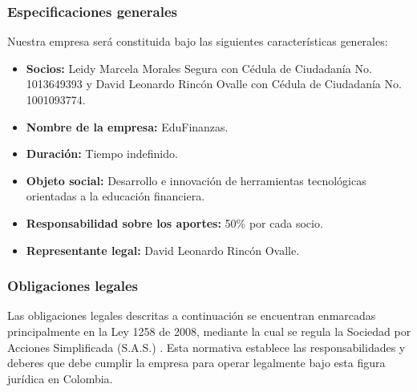 \subsubsection*{Especificaciones generales}


Nuestra empresa será constituida bajo las siguientes características generales:

\begin{itemize}
	\item \textbf{Socios:} Leidy Marcela Morales Segura con Cédula de Ciudadanía No. 1013649393 y David Leonardo Rincón Ovalle con Cédula de Ciudadanía No. 1001093774.
	
	\item \textbf{Nombre de la empresa:} EduFinanzas.
	
	\item \textbf{Duración:} Tiempo indefinido.
	
	\item \textbf{Objeto social:} Desarrollo e innovación de herramientas tecnológicas orientadas a la educación financiera.
	
	\item \textbf{Responsabilidad sobre los aportes:} 50\% por cada socio.
	
	\item \textbf{Representante legal:} David Leonardo Rincón Ovalle.  
\end{itemize}

{}
\subsubsection*{Obligaciones legales}


Las obligaciones legales descritas a continuación se encuentran enmarcadas principalmente en la Ley 1258 de 2008, mediante la cual se regula la Sociedad por Acciones Simplificada (S.A.S.) \parencite{Ley1258}. Esta normativa establece las responsabilidades y deberes que debe cumplir la empresa para operar legalmente bajo esta figura jurídica en Colombia.

